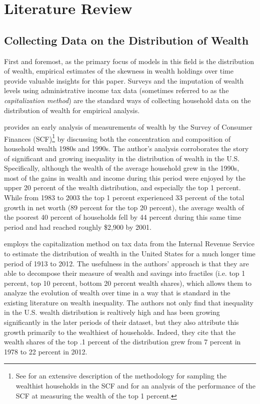 \onlyinsubfile{\setcounter{section}{1}}
\section{Literature Review}
\notinsubfile{\label{sec:Literature Review}}

\subsection{Collecting Data on the Distribution of Wealth}

\par First and foremost, as the primary focus of models in this field is the distribution of wealth, empirical estimates of the skewness in wealth holdings over time provide valuable insights for this paper. Surveys and the imputation of wealth levels using administrative income tax data (sometimes referred to as the \textit{capitalization method}) are the standard ways of collecting household data on the distribution of wealth for empirical analysis.

\par \cite{wolff2004} provides an early analysis of measurements of wealth by the Survey of Consumer Finances (SCF)\footnote{ See \cite{kennickell2017a} for an extensive description of the methodology for sampling the wealthist households in the SCF and \cite{kennickell2017b} for an analysis of the performance of the SCF at measuring the wealth of the top 1 percent.} by discussing both the concentration and composition of household wealth 1980s and 1990s. The author's analysis corroborates the story of significant and growing inequality in the distribution of wealth in the U.S. Specifically, although the wealth of the average household grew in the 1990s, most of the gains in wealth and income during this period were enjoyed by the upper 20 percent of the wealth distribution, and especially the top 1 percent. While from 1983 to 2003 the top 1 percent experienced 33 percent of the total growth in net worth (89 percent for the top 20 percent), the average wealth of the poorest 40 percent of households fell by 44 percent during this same time period and had reached roughly \$2,900 by 2001.

\cite{sz16} employs the capitalization method on tax data from the Internal Revenue Service to estimate the distribution of wealth in the United States for a much longer time period of 1913 to 2012. The usefulness in the authors' approach is that they are able to decompose their measure of wealth and savings into fractiles (i.e. top 1 percent, top 10 percent, bottom 20 percent wealth shares), which allows them to analyze the evolution of wealth over time in a way that is standard in the existing literature on wealth inequality. The authors not only find that inequality in the U.S. wealth distribution is realtively high and has been growing significantly in the later periods of their dataset, but they also attribute this growth primarily to the wealthiest of households. Indeed, they cite that the wealth shares of the top .1 percent of the distribution grew from 7 percent in 1978 to 22 percent in 2012. 

